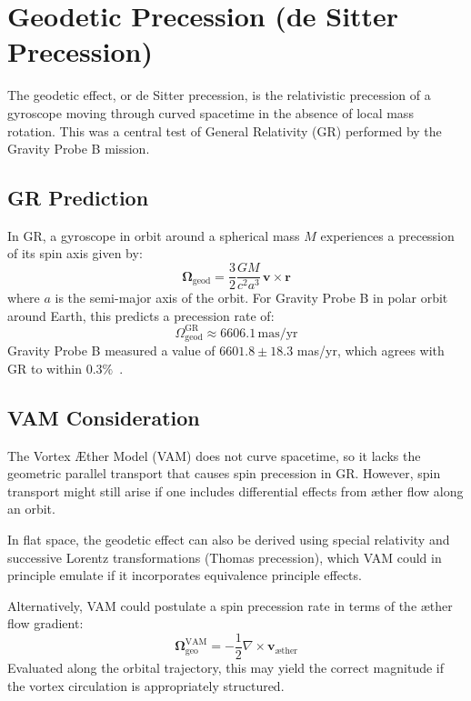 \documentclass[a4paper, aps,preprint,superscriptaddress, 12pt]{revtex4}
\begin{document}
\section{Geodetic Precession (de Sitter Precession)}

The geodetic effect, or de Sitter precession, is the relativistic precession of a gyroscope moving through curved spacetime in the absence of local mass rotation. This was a central test of General Relativity (GR) performed by the Gravity Probe B mission.

\subsection*{GR Prediction}

In GR, a gyroscope in orbit around a spherical mass $M$ experiences a precession of its spin axis given by:
\begin{equation}
    \boldsymbol{\Omega}_\text{geod} = \frac{3}{2} \frac{GM}{c^2 a^3} \, \mathbf{v} \times \mathbf{r}
\end{equation}
where $a$ is the semi-major axis of the orbit. For Gravity Probe B in polar orbit around Earth, this predicts a precession rate of:
\begin{equation}
    \Omega_\text{geod}^\text{GR} \approx 6606.1 \, \text{mas/yr}
\end{equation}
Gravity Probe B measured a value of $6601.8 \pm 18.3$ mas/yr, which agrees with GR to within $0.3\%$~\cite{everitt2011}.

\subsection*{VAM Consideration}

The Vortex Æther Model (VAM) does not curve spacetime, so it lacks the geometric parallel transport that causes spin precession in GR. However, spin transport might still arise if one includes differential effects from æther flow along an orbit.

In flat space, the geodetic effect can also be derived using special relativity and successive Lorentz transformations (Thomas precession), which VAM could in principle emulate if it incorporates equivalence principle effects.

Alternatively, VAM could postulate a spin precession rate in terms of the æther flow gradient:
\begin{equation}
    \boldsymbol{\Omega}_\text{geo}^\text{VAM} = -\frac{1}{2} \nabla \times \mathbf{v}_\text{æther}
\end{equation}
Evaluated along the orbital trajectory, this may yield the correct magnitude if the vortex circulation is appropriately structured.
\end{document}
